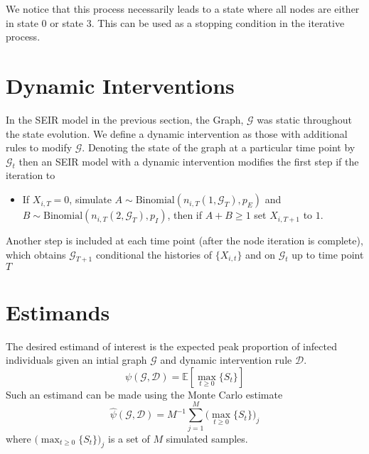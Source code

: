 \documentclass{article}
\newcommand{\e}[1]{{\mathbb E}\left[ #1 \right]}
\begin{document}
    We notice that this process necessarily leads to a state where all nodes are either in state 0 or state 3. This can be used
    as a stopping condition in the iterative process.

    \section{Dynamic Interventions}

    In the SEIR model in the previous section, the Graph, $\mathcal{G}$ was static throughout the state evolution.
    We define a dynamic intervention as those with additional rules to modify $\mathcal{G}$. Denoting the state of the
    graph at a particular time point by $\mathcal{G}_t$ then an SEIR model with a dynamic intervention modifies the first
    step if the iteration to
    \begin{itemize}
        \item If $X_{i,T} = 0$, simulate $A \sim \text{Binomial}(n_{i,T}(1,\mathcal{G}_T),p_E)$ and
              $B \sim \text{Binomial}(n_{i,T}(2,\mathcal{G}_T),p_I)$, then if $A+B \geq 1$ set $X_{i,T+1}$ to $1$.
    \end{itemize}
    Another step is included at each time point (after the node iteration is complete), which obtains $\mathcal{G}_{T+1}$
    conditional the histories of $\{X_{i,t}\}$ and on $\mathcal{G}_t$ up to time point $T$

    \section{Estimands}

    The desired estimand of interest is the expected peak proportion of infected individuals given an intial graph $\mathcal{G}$
    and dynamic intervention rule $\mathcal{D}$.
    \begin{equation}
        \psi(\mathcal{G},\mathcal{D}) = \e{\max_{t \geq 0 } \{S_t\} }
    \end{equation}
    Such an estimand can be made using the Monte Carlo estimate
    \begin{equation}
        \hat{\psi}(\mathcal{G},\mathcal{D}) = M^{-1} \sum_{j=1}^{M} \big(\max_{t \geq 0 } \{S_t\}\big)_j
    \end{equation}
    where $\big(\max_{t \geq 0 } \{S_t\}\big)_j$ is a set of $M$ simulated samples.
\end{document}
